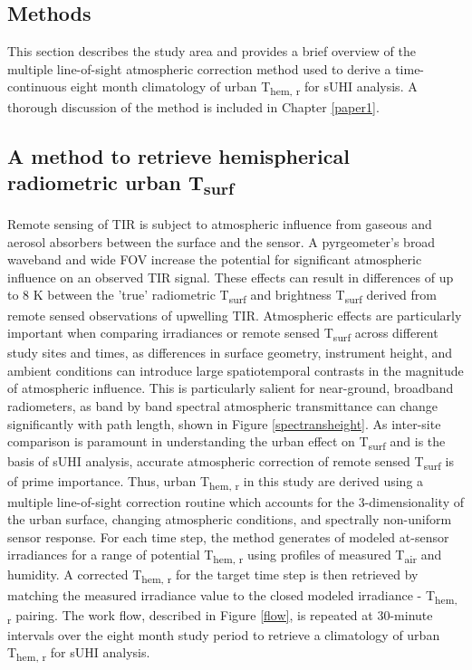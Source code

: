 \begin{bibunit}
\section{Methods}

This section describes the study area and provides a brief overview of the multiple line-of-sight atmospheric correction method used to derive a time-continuous eight month climatology of urban T\textsubscript{hem, r} for sUHI analysis. A thorough discussion of the method is included in Chapter \ref{paper1}.

\subsection{A method to retrieve hemispherical radiometric urban T\textsubscript{surf}}

Remote sensing of TIR is subject to atmospheric influence from gaseous and aerosol absorbers between the surface and the sensor. A pyrgeometer's broad waveband and wide FOV increase the potential for significant atmospheric influence on an observed TIR signal. These effects can result in differences of up to 8 \si{\kelvin} between the 'true' radiometric T\textsubscript{surf} and brightness T\textsubscript{surf} derived from remote sensed observations of upwelling TIR. Atmospheric effects are particularly important when comparing irradiances or remote sensed T\textsubscript{surf} across different study sites and times, as differences in surface geometry, instrument height, and ambient conditions can introduce large spatiotemporal contrasts in the magnitude of atmospheric influence. This is particularly salient for near-ground, broadband radiometers, as band by band spectral atmospheric transmittance can change significantly with path length, shown in Figure \ref{spectransheight}. As inter-site comparison is paramount in understanding the urban effect on T\textsubscript{surf} and is the basis of sUHI analysis, accurate atmospheric correction of remote sensed T\textsubscript{surf} is of prime importance. Thus, urban T\textsubscript{hem, r} in this study are derived using a multiple line-of-sight correction routine which accounts for the 3-dimensionality of the urban surface, changing atmospheric conditions, and spectrally non-uniform sensor response. For each time step, the method generates of modeled at-sensor irradiances for a range of potential T\textsubscript{hem, r} using profiles of measured T\textsubscript{air} and humidity. A corrected T\textsubscript{hem, r} for the target time step is then retrieved by matching the measured irradiance value to the closed modeled irradiance - T\textsubscript{hem, r} pairing. The work flow, described in Figure \ref{flow}, is repeated at 30-minute intervals over the eight month study period to retrieve a climatology of urban T\textsubscript{hem, r} for sUHI analysis.


\end{bibunit}
